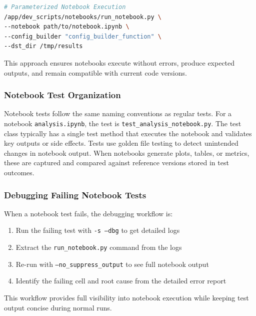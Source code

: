 \begin{lstlisting}[language=bash]
# Parameterized Notebook Execution
/app/dev_scripts/notebooks/run_notebook.py \
--notebook path/to/notebook.ipynb \
--config_builder "config_builder_function" \
--dst_dir /tmp/results
\end{lstlisting}

This approach ensures notebooks execute without errors, produce expected
outputs, and remain compatible with current code versions.

\subsubsection{Notebook Test Organization}
Notebook tests follow the same naming conventions as regular tests. For
a notebook \texttt{analysis.ipynb}, the test is \texttt{test\_analysis\_notebook.py}.
The test class typically has a single test method that executes the
notebook and validates key outputs or side effects. Tests use golden file
testing to detect unintended changes in notebook output. When notebooks
generate plots, tables, or metrics, these are captured and compared against
reference versions stored in test outcomes.

\subsubsection{Debugging Failing Notebook Tests}
When a notebook test fails, the debugging workflow is:
\begin{enumerate}
  \item Run the failing test with \texttt{-s --dbg} to get detailed logs

  \item Extract the \texttt{run\_notebook.py} command from the logs

  \item Re-run with \texttt{--no\_suppress\_output} to see full notebook
    output

  \item Identify the failing cell and root cause from the detailed error
    report
\end{enumerate}

This workflow provides full visibility into notebook execution while
keeping test output concise during normal runs.

